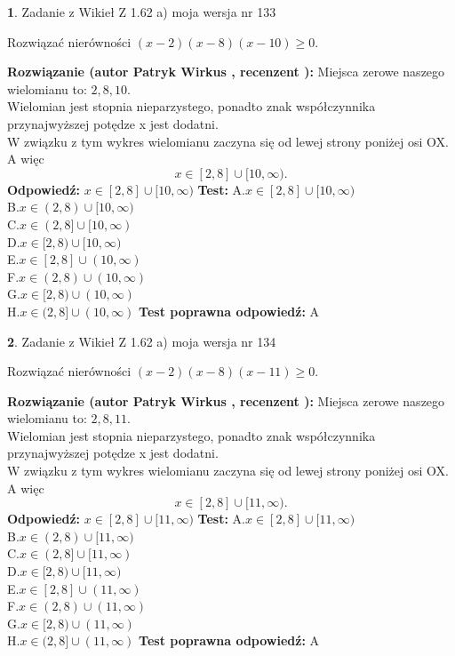 \documentclass[12pt, a4paper]{article}
\theoremstyle{definition} %
\newtheorem{zad}{}
\newcommand{\zadStart}[1]{\begin{zad}#1\newline}
\newcommand{\zadStop}{\end{zad}}
\newcommand{\rozwStart}[2]{\noindent \textbf{Rozwiązanie (autor #1 , recenzent #2): }\newline}
\newcommand{\rozwStop}{\newline}
\newcommand{\odpStart}{\noindent \textbf{Odpowiedź:}\newline}
\newcommand{\odpStop}{\newline}
\newcommand{\testStart}{\noindent \textbf{Test:}\newline}
\newcommand{\testStop}{\newline}
\newcommand{\kluczStart}{\noindent \textbf{Test poprawna odpowiedź:}\newline}
\newcommand{\kluczStop}{\newline}
\begin{document}
\zadStart{Zadanie z Wikieł Z 1.62 a) moja wersja nr 133}

Rozwiązać nierówności $(x-2)(x-8)(x-10)\ge0$.
\zadStop
\rozwStart{Patryk Wirkus}{}
Miejsca zerowe naszego wielomianu to: $2, 8, 10$.\\
Wielomian jest stopnia nieparzystego, ponadto znak współczynnika przy\linebreak najwyższej potędze x jest dodatni.\\ W związku z tym wykres wielomianu zaczyna się od lewej strony poniżej osi OX. A więc $$x \in [2,8] \cup [10,\infty).$$
\rozwStop
\odpStart
$x \in [2,8] \cup [10,\infty)$
\odpStop
\testStart
A.$x \in [2,8] \cup [10,\infty)$\\
B.$x \in (2,8) \cup [10,\infty)$\\
C.$x \in (2,8] \cup [10,\infty)$\\
D.$x \in [2,8) \cup [10,\infty)$\\
E.$x \in [2,8] \cup (10,\infty)$\\
F.$x \in (2,8) \cup (10,\infty)$\\
G.$x \in [2,8) \cup (10,\infty)$\\
H.$x \in (2,8] \cup (10,\infty)$
\testStop
\kluczStart
A
\kluczStop



\zadStart{Zadanie z Wikieł Z 1.62 a) moja wersja nr 134}

Rozwiązać nierówności $(x-2)(x-8)(x-11)\ge0$.
\zadStop
\rozwStart{Patryk Wirkus}{}
Miejsca zerowe naszego wielomianu to: $2, 8, 11$.\\
Wielomian jest stopnia nieparzystego, ponadto znak współczynnika przy\linebreak najwyższej potędze x jest dodatni.\\ W związku z tym wykres wielomianu zaczyna się od lewej strony poniżej osi OX. A więc $$x \in [2,8] \cup [11,\infty).$$
\rozwStop
\odpStart
$x \in [2,8] \cup [11,\infty)$
\odpStop
\testStart
A.$x \in [2,8] \cup [11,\infty)$\\
B.$x \in (2,8) \cup [11,\infty)$\\
C.$x \in (2,8] \cup [11,\infty)$\\
D.$x \in [2,8) \cup [11,\infty)$\\
E.$x \in [2,8] \cup (11,\infty)$\\
F.$x \in (2,8) \cup (11,\infty)$\\
G.$x \in [2,8) \cup (11,\infty)$\\
H.$x \in (2,8] \cup (11,\infty)$
\testStop
\kluczStart
A
\kluczStop
\end{document}
